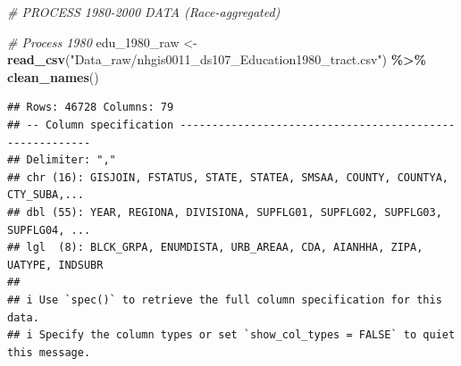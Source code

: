 \documentclass[
]{article}
\newenvironment{Shaded}{\begin{snugshade}}{\end{snugshade}}
\newcommand{\CommentTok}[1]{\textcolor[rgb]{0.56,0.35,0.01}{\textit{#1}}}
\newcommand{\FunctionTok}[1]{\textcolor[rgb]{0.13,0.29,0.53}{\textbf{#1}}}
\newcommand{\NormalTok}[1]{#1}
\newcommand{\OtherTok}[1]{\textcolor[rgb]{0.56,0.35,0.01}{#1}}
\newcommand{\SpecialCharTok}[1]{\textcolor[rgb]{0.81,0.36,0.00}{\textbf{#1}}}
\newcommand{\StringTok}[1]{\textcolor[rgb]{0.31,0.60,0.02}{#1}}
\begin{document}
\begin{Shaded}
\begin{Highlighting}[]
\CommentTok{\# PROCESS 1980{-}2000 DATA (Race{-}aggregated)}


\CommentTok{\# Process 1980}
\NormalTok{edu\_1980\_raw }\OtherTok{\textless{}{-}} \FunctionTok{read\_csv}\NormalTok{(}\StringTok{"Data\_raw/nhgis0011\_ds107\_Education1980\_tract.csv"}\NormalTok{) }\SpecialCharTok{\%\textgreater{}\%} \FunctionTok{clean\_names}\NormalTok{()}
\end{Highlighting}
\end{Shaded}

\begin{verbatim}
## Rows: 46728 Columns: 79
## -- Column specification --------------------------------------------------------
## Delimiter: ","
## chr (16): GISJOIN, FSTATUS, STATE, STATEA, SMSAA, COUNTY, COUNTYA, CTY_SUBA,...
## dbl (55): YEAR, REGIONA, DIVISIONA, SUPFLG01, SUPFLG02, SUPFLG03, SUPFLG04, ...
## lgl  (8): BLCK_GRPA, ENUMDISTA, URB_AREAA, CDA, AIANHHA, ZIPA, UATYPE, INDSUBR
## 
## i Use `spec()` to retrieve the full column specification for this data.
## i Specify the column types or set `show_col_types = FALSE` to quiet this message.
\end{verbatim}
\end{document}
